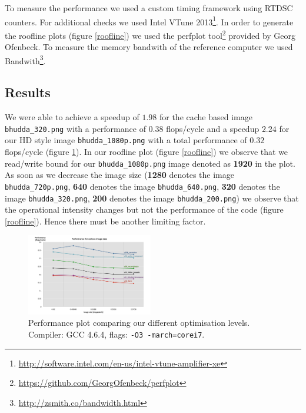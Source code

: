 To measure the performance we used a custom timing framework using RTDSC counters. For additional checks we used Intel VTune 2013\footnote{\url{http://software.intel.com/en-us/intel-vtune-amplifier-xe}}. In order to generate the roofline plots (figure \ref{roofline}) we used the perfplot tool\footnote{\url{https://github.com/GeorgOfenbeck/perfplot}} provided by Georg Ofenbeck. To measure the memory bandwith of the reference computer we used Bandwith\footnote{\url{http://zsmith.co/bandwidth.html}}.
\subsection{Results}
We were able to achieve a speedup of $1.98$ for the cache based image \texttt{bhudda\_320.png} with a performance of $0.38$ flops/cycle and a speedup $2.24$ for our HD style image \newline\texttt{bhudda\_1080p.png} with a total performance of $0.32$ flops/cycle (figure \ref{performance}). In our roofline plot \cite{Williams:2009:RIV:1498765.1498785} (figure \ref{roofline}) we observe that we read/write bound for our \texttt{bhudda\_1080p.png} image denoted as \textbf{1920} in the plot. As soon as we decrease the image size (\textbf{1280} denotes the image \texttt{bhudda\_720p.png}, \textbf{640} denotes the image \texttt{bhudda\_640.png}, \textbf{320} denotes the image \texttt{bhudda\_320.png}, \textbf{200} denotes the image \texttt{bhudda\_200.png}) we observe that the operational intensity changes but not the performance of the code (figure \ref{roofline}). Hence there must be another limiting factor. 

\setlength\fboxsep{0pt}
\setlength\fboxrule{0.5pt}
 
\begin{figure}\vspace{-10mm}
  \includegraphics[trim=10mm 0mm 10mm 0mm, clip, width=0.49\textwidth]{figures/performance}
  \caption{Performance plot comparing our different optimisation levels. Compiler: GCC 4.6.4, flags: \lstinline{-O3 -march=corei7}.\label{performance}}
\end{figure}
 

